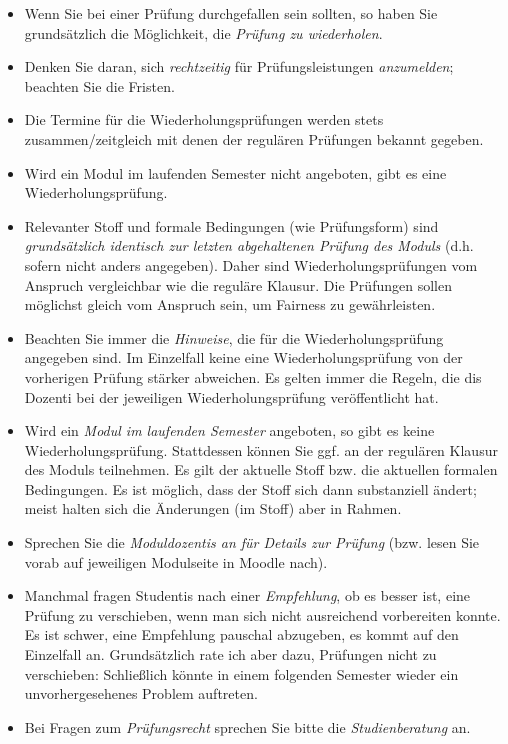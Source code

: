 \documentclass[
  a4paper,
  DIV=11]{scrreprt}
\providecommand{\tightlist}{%
  \setlength{\itemsep}{0pt}\setlength{\parskip}{0pt}}\usepackage{longtable,booktabs,array}
\theoremstyle{definition}
\theoremstyle{remark}
\begin{document}
\begin{itemize}
\tightlist
\item
  Wenn Sie bei einer Prüfung durchgefallen sein sollten, so haben Sie
  grundsätzlich die Möglichkeit, die \emph{Prüfung zu wiederholen}.
\item
  Denken Sie daran, sich \emph{rechtzeitig} für Prüfungsleistungen
  \emph{anzumelden}; beachten Sie die Fristen.
\item
  Die Termine für die Wiederholungsprüfungen werden stets
  zusammen/zeitgleich mit denen der regulären Prüfungen bekannt gegeben.
\item
  Wird ein Modul im laufenden Semester nicht angeboten, gibt es eine
  Wiederholungsprüfung.
\item
  Relevanter Stoff und formale Bedingungen (wie Prüfungsform) sind
  \emph{grundsätzlich identisch zur letzten abgehaltenen Prüfung des
  Moduls} (d.h. sofern nicht anders angegeben). Daher sind
  Wiederholungsprüfungen vom Anspruch vergleichbar wie die reguläre
  Klausur. Die Prüfungen sollen möglichst gleich vom Anspruch sein, um
  Fairness zu gewährleisten.
\item
  Beachten Sie immer die \emph{Hinweise}, die für die
  Wiederholungsprüfung angegeben sind. Im Einzelfall keine eine
  Wiederholungsprüfung von der vorherigen Prüfung stärker abweichen. Es
  gelten immer die Regeln, die dis Dozenti bei der jeweiligen
  Wiederholungsprüfung veröffentlicht hat.
\item
  Wird ein \emph{Modul im laufenden Semester} angeboten, so gibt es
  keine Wiederholungsprüfung. Stattdessen können Sie ggf. an der
  regulären Klausur des Moduls teilnehmen. Es gilt der aktuelle Stoff
  bzw. die aktuellen formalen Bedingungen. Es ist möglich, dass der
  Stoff sich dann substanziell ändert; meist halten sich die Änderungen
  (im Stoff) aber in Rahmen.
\item
  Sprechen Sie die \emph{Moduldozentis an für Details zur Prüfung} (bzw.
  lesen Sie vorab auf jeweiligen Modulseite in Moodle nach).
\item
  Manchmal fragen Studentis nach einer \emph{Empfehlung}, ob es besser
  ist, eine Prüfung zu verschieben, wenn man sich nicht ausreichend
  vorbereiten konnte. Es ist schwer, eine Empfehlung pauschal abzugeben,
  es kommt auf den Einzelfall an. Grundsätzlich rate ich aber dazu,
  Prüfungen nicht zu verschieben: Schließlich könnte in einem folgenden
  Semester wieder ein unvorhergesehenes Problem auftreten.
\item
  Bei Fragen zum \emph{Prüfungsrecht} sprechen Sie bitte die
  \emph{Studienberatung} an.
\end{itemize}
\end{document}
